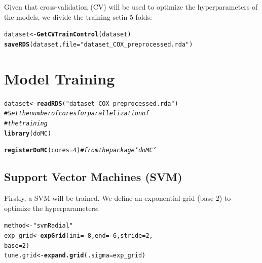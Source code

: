 \documentclass[twoside,a4wide,12pt]{article}\usepackage[]{graphicx}\usepackage[]{color}
\makeatletter
\newcommand{\hlnum}[1]{\textcolor[rgb]{0.686,0.059,0.569}{#1}}%
\newcommand{\hlstr}[1]{\textcolor[rgb]{0.192,0.494,0.8}{#1}}%
\newcommand{\hlcom}[1]{\textcolor[rgb]{0.678,0.584,0.686}{\textit{#1}}}%
\newcommand{\hlopt}[1]{\textcolor[rgb]{0,0,0}{#1}}%
\newcommand{\hlstd}[1]{\textcolor[rgb]{0.345,0.345,0.345}{#1}}%
\newcommand{\hlkwb}[1]{\textcolor[rgb]{0.69,0.353,0.396}{#1}}%
\newcommand{\hlkwc}[1]{\textcolor[rgb]{0.333,0.667,0.333}{#1}}%
\newcommand{\hlkwd}[1]{\textcolor[rgb]{0.737,0.353,0.396}{\textbf{#1}}}%
\newenvironment{kframe}{%
 \def\at@end@of@kframe{}%
 \ifinner\ifhmode%
  \def\at@end@of@kframe{\end{minipage}}%
  \begin{minipage}{\columnwidth}%
 \fi\fi%
 \def\FrameCommand##1{\hskip\@totalleftmargin \hskip-\fboxsep
 \colorbox{shadecolor}{##1}\hskip-\fboxsep
     \hskip-\linewidth \hskip-\@totalleftmargin \hskip\columnwidth}%
 \MakeFramed {\advance\hsize-\width
   \@totalleftmargin\z@ \linewidth\hsize
   \@setminipage}}%
 {\par\unskip\endMakeFramed%
 \at@end@of@kframe}
\newenvironment{knitrout}{}{} %
\makeatother
\begin{document}
Given that cross-validation (CV) will be used to optimize the hyperparameters of the models, we divide the training setin 5 folds:
\begin{knitrout}
\color{fgcolor}\begin{kframe}
\begin{alltt}
\hlstd{dataset} \hlkwb{<-} \hlkwd{GetCVTrainControl}\hlstd{(dataset)}
\hlkwd{saveRDS}\hlstd{(dataset,} \hlkwc{file} \hlstd{=} \hlstr{"dataset_COX_preprocessed.rda"}\hlstd{)}
\end{alltt}
\end{kframe}
\end{knitrout}


\section{Model Training}

\begin{knitrout}
\color{fgcolor}\begin{kframe}
\begin{alltt}
\hlstd{dataset} \hlkwb{<-} \hlkwd{readRDS}\hlstd{(}\hlstr{"dataset_COX_preprocessed.rda"}\hlstd{)}
\hlcom{# Set the number of cores for parallelization of}
\hlcom{# the training}
\hlkwd{library}\hlstd{(doMC)}
\end{alltt}


{\ttfamily\noindent\itshape\color{messagecolor}{\#\# Loading required package: iterators}}\begin{alltt}
\hlkwd{registerDoMC}\hlstd{(}\hlkwc{cores} \hlstd{=} \hlnum{4}\hlstd{)}  \hlcom{#from the package 'doMC'}
\end{alltt}
\end{kframe}
\end{knitrout}


\subsection{Support Vector Machines (SVM)}
Firstly, a SVM will be trained. We define an exponential grid (base 2) to optimize the hyperparameters:

\begin{knitrout}
\color{fgcolor}\begin{kframe}
\begin{alltt}
\hlstd{method} \hlkwb{<-} \hlstr{"svmRadial"}
\hlstd{exp_grid} \hlkwb{<-} \hlkwd{expGrid}\hlstd{(}\hlkwc{ini} \hlstd{=} \hlopt{-}\hlnum{8}\hlstd{,} \hlkwc{end} \hlstd{=} \hlopt{-}\hlnum{6}\hlstd{,} \hlkwc{stride} \hlstd{=} \hlnum{2}\hlstd{,}
    \hlkwc{base} \hlstd{=} \hlnum{2}\hlstd{)}
\hlstd{tune.grid} \hlkwb{<-} \hlkwd{expand.grid}\hlstd{(}\hlkwc{.sigma} \hlstd{= exp_grid)}
\end{alltt}
\end{kframe}
\end{knitrout}
\end{document}
